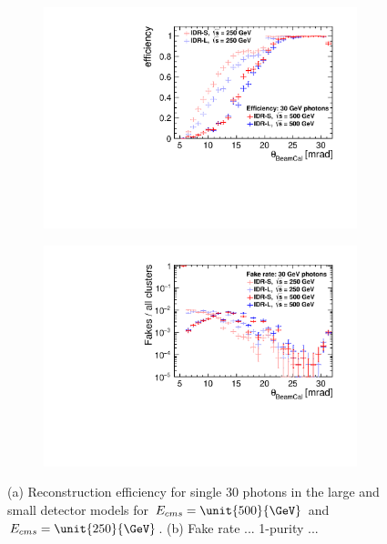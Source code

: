 \begin{figure}[htbp]
\begin{subfigure}{0.49\hsize}
 \includegraphics[width=\hsize]{Performance/fig/Eff_30GeVPhotons_different_detectors_differentCOMenergies.pdf}
 \caption{ \label{fig:perf:beamcal_eff}}
 \end{subfigure}
\begin{subfigure}{0.49\hsize}
 \includegraphics[width=\hsize]{Performance/fig/Fakes_30GeVPhotons_different_detectors_differentCOMenergies.pdf}
 \caption{  \label{fig:perf:beamcal_fake}}
 \end{subfigure}
\caption{ (a) Reconstruction efficiency for single \unit{30}{\GeV} photons in the large and small detector models for $E_{cms}=\unit{500}{\GeV}$  and
  $E_{cms}=\unit{250}{\GeV}$.
  (b)  Fake rate ...  1-purity ... 
}
\label{fig:perf:beamcal}
\end{figure}
